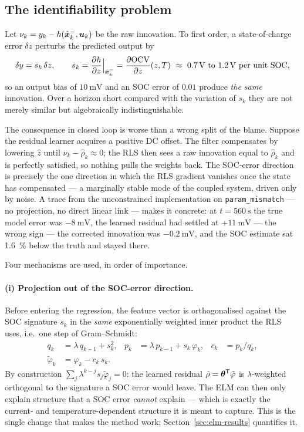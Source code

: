 \subsection{The identifiability problem}
\label{sec:elm-ident}
Let $\nu_k = y_k - h(\hat{\bm{x}}^{-}_k,\bm{u}_k)$ be the raw innovation.  To first order, a state-of-charge
error $\delta z$ perturbs the predicted output by
\begin{equation}\label{eq:elm-sens}
\delta y = s_k\,\delta z,\qquad
s_k = \frac{\partial h}{\partial \soc}\Big|_{\xminus_k} = \frac{\partial\ocv}{\partial\soc}(\soc,T)
\ \approx\ \SIrange{0.7}{1.2}{\volt}\ \text{per unit SOC},
\end{equation}
so an output bias of $\SI{10}{\milli\volt}$ and an SOC error of $\num{0.01}$ produce \emph{the same}
innovation.  Over a horizon short compared with the variation of $s_k$ they are not merely similar
but algebraically indistinguishable.

The consequence in closed loop is worse than a wrong split of the blame.  Suppose the residual
learner acquires a positive DC offset.  The filter compensates by lowering $\hat z$ until
$\nu_k - \hat\rho_k \approx 0$; the RLS then sees a raw innovation equal to $\hat\rho_k$ and is
perfectly satisfied, so nothing pulls the weights back.  The SOC-error direction is precisely the
one direction in which the RLS gradient vanishes once the state has compensated --- a marginally
stable mode of the coupled system, driven only by noise.  A trace from the unconstrained
implementation on \texttt{param\_mismatch} --- no projection, no direct linear link --- makes it
concrete: at $t = \SI{560}{\second}$ the true model error was $\SI{-8}{\milli\volt}$, the learned
residual had settled at $+\SI{11}{\milli\volt}$ --- the wrong sign --- the corrected innovation was
$\SI{-0.2}{\milli\volt}$, and the SOC estimate sat \SI{1.6}{\percent} below the truth and stayed
there.

Four mechanisms are used, in order of importance.

\paragraph{(i) Projection out of the SOC-error direction.}  Before entering the regression, the
feature vector is orthogonalised against the SOC signature $s_k$ in the \emph{same} exponentially
weighted inner product the RLS uses, i.e.\ one step of Gram--Schmidt:
\begin{align}
q_k &= \lambda\,q_{k-1} + s_k^2, &
p_k &= \lambda\,p_{k-1} + s_k\,\varphi_k, &
c_k &= p_k / q_k, \label{eq:elm-gs}\\
\tilde\varphi_k &= \varphi_k - c_k\, s_k. &&&& \label{eq:elm-proj}
\end{align}
By construction $\sum_j \lambda^{k-j} s_j\tilde\varphi_j = 0$: the learned residual
$\hat\rho = \bm{\theta}^{\mathsf{T}}\tilde\varphi$ is $\lambda$-weighted orthogonal to the signature a SOC error
would leave.  The ELM can then only explain structure that a SOC error \emph{cannot} explain ---
which is exactly the current- and temperature-dependent structure it is meant to capture.  This is
the single change that makes the method work; Section~\ref{sec:elm-results} quantifies it.

